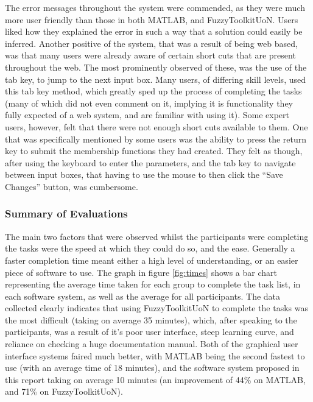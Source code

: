The error messages throughout the system were commended, as they were much more user friendly than those in both MATLAB, and FuzzyToolkitUoN. Users liked how they explained the error in such a way that a solution could easily be inferred. Another positive of the system, that was a result of being web based, was that many users were already aware of certain short cuts that are present throughout the web. The most prominently observed of these, was the use of the tab key, to jump to the next input box. Many users, of differing skill levels, used this tab key method, which greatly sped up the process of completing the tasks (many of which did not even comment on it, implying it is functionality they fully expected of a web system, and are familiar with using it). Some expert users, however, felt that there were not enough short cuts available to them. One that was specifically mentioned by some users was the ability to press the return key to submit the membership functions they had created. They felt as though, after using the keyboard to enter the parameters, and the tab key to navigate between input boxes, that having to use the mouse to then click the ``Save Changes'' button, was cumbersome.

\subsubsection{Summary of Evaluations}
\vspace{-2mm}	
The main two factors that were observed whilst the participants were completing the tasks were the speed at which they could do so, and the ease. Generally a faster completion time meant either a high level of understanding, or an easier piece of software to use. The graph in figure \ref{fig:times} shows a bar chart representing the average time taken for each group to complete the task list, in each software system, as well as the average for all participants. The data collected clearly indicates that using FuzzyToolkitUoN to complete the tasks was the most difficult (taking on average  35 minutes), which, after speaking to the participants, was a result of it's poor user interface, steep learning curve, and reliance on checking a huge documentation manual. Both of the graphical user interface systems faired much better, with MATLAB being the second fastest to use (with an average time of 18 minutes), and the software system proposed in this report taking on average 10 minutes (an improvement of 44\% on MATLAB, and 71\% on FuzzyToolkitUoN). 
			
